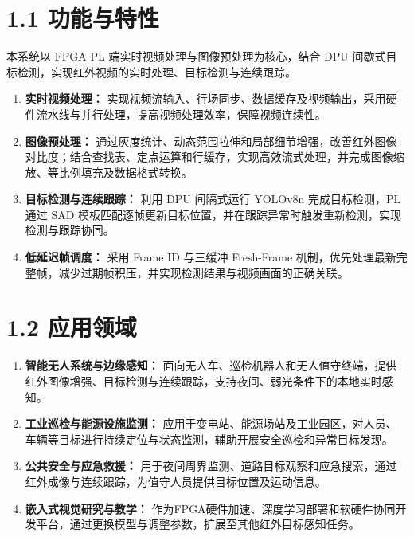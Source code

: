 \documentclass[UTF8,a4paper,12pt,fontset=windows]{ctexart}
\begin{document}
\section*{1.1 功能与特性}

本系统以 FPGA PL 端实时视频处理与图像预处理为核心，结合 DPU 间歇式目标检测，实现红外视频的实时处理、目标检测与连续跟踪。

\begin{enumerate}
    \item \textbf{实时视频处理：}
    实现视频流输入、行场同步、数据缓存及视频输出，采用硬件流水线与并行处理，提高视频处理效率，保障视频连续性。

    \item \textbf{图像预处理：}
    通过灰度统计、动态范围拉伸和局部细节增强，改善红外图像对比度；结合查找表、定点运算和行缓存，实现高效流式处理，并完成图像缩放、等比例填充及数据格式转换。

    \item \textbf{目标检测与连续跟踪：}
    利用 DPU 间隔式运行 YOLOv8n 完成目标检测，PL 通过 SAD 模板匹配逐帧更新目标位置，并在跟踪异常时触发重新检测，实现检测与跟踪协同。

    \item \textbf{低延迟帧调度：}
    采用 Frame ID 与三缓冲 Fresh-Frame 机制，优先处理最新完整帧，减少过期帧积压，并实现检测结果与视频画面的正确关联。
\end{enumerate}


\section*{1.2 应用领域}

\begin{enumerate}
    \item \textbf{智能无人系统与边缘感知：}
    面向无人车、巡检机器人和无人值守终端，提供红外图像增强、目标检测与连续跟踪，支持夜间、弱光条件下的本地实时感知。

    \item \textbf{工业巡检与能源设施监测：}
    应用于变电站、能源场站及工业园区，对人员、车辆等目标进行持续定位与状态监测，辅助开展安全巡检和异常目标发现。

    \item \textbf{公共安全与应急救援：}
    用于夜间周界监测、道路目标观察和应急搜索，通过红外成像与连续跟踪，为值守人员提供目标位置及运动信息。

    \item \textbf{嵌入式视觉研究与教学：}
    作为FPGA硬件加速、深度学习部署和软硬件协同开发平台，通过更换模型与调整参数，扩展至其他红外目标感知任务。
\end{enumerate}
\end{document}
